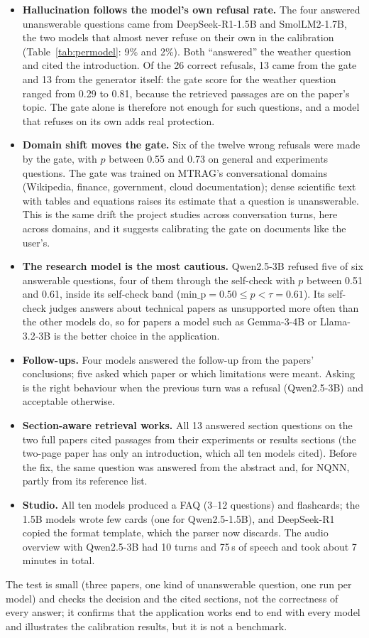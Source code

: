 \begin{itemize}
\item \textbf{Hallucination follows the model's own refusal rate.} The four answered unanswerable questions came from DeepSeek-R1-1.5B and SmolLM2-1.7B, the two models that almost never refuse on their own in the calibration (Table~\ref{tab:permodel}: 9\% and 2\%). Both ``answered'' the weather question and cited the introduction. Of the 26 correct refusals, 13 came from the gate and 13 from the generator itself: the gate score for the weather question ranged from 0.29 to 0.81, because the retrieved passages are on the paper's topic. The gate alone is therefore not enough for such questions, and a model that refuses on its own adds real protection.
\item \textbf{Domain shift moves the gate.} Six of the twelve wrong refusals were made by the gate, with $p$ between 0.55 and 0.73 on general and experiments questions. The gate was trained on MTRAG's conversational domains (Wikipedia, finance, government, cloud documentation); dense scientific text with tables and equations raises its estimate that a question is unanswerable. This is the same drift the project studies across conversation turns, here across domains, and it suggests calibrating the gate on documents like the user's.
\item \textbf{The research model is the most cautious.} Qwen2.5-3B refused five of six answerable questions, four of them through the self-check with $p$ between 0.51 and 0.61, inside its self-check band ($\text{min\_p}=0.50 \le p < \tau=0.61$). Its self-check judges answers about technical papers as unsupported more often than the other models do, so for papers a model such as Gemma-3-4B or Llama-3.2-3B is the better choice in the application.
\item \textbf{Follow-ups.} Four models answered the follow-up from the papers' conclusions; five asked which paper or which limitations were meant. Asking is the right behaviour when the previous turn was a refusal (Qwen2.5-3B) and acceptable otherwise.
\item \textbf{Section-aware retrieval works.} All 13 answered section questions on the two full papers cited passages from their experiments or results sections (the two-page paper has only an introduction, which all ten models cited). Before the fix, the same question was answered from the abstract and, for NQNN, partly from its reference list.
\item \textbf{Studio.} All ten models produced a FAQ (3--12 questions) and flashcards; the 1.5B models wrote few cards (one for Qwen2.5-1.5B), and DeepSeek-R1 copied the format template, which the parser now discards. The audio overview with Qwen2.5-3B had 10 turns and 75\,s of speech and took about 7 minutes in total.
\end{itemize}
The test is small (three papers, one kind of unanswerable question, one run per model) and checks the decision and the cited sections, not the correctness of every answer; it confirms that the application works end to end with every model and illustrates the calibration results, but it is not a benchmark.

